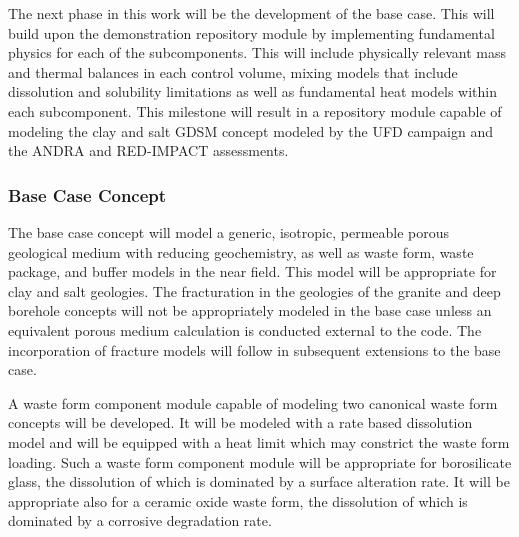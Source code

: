 
The next phase in this work will be the development of the base case. This will 
build upon the demonstration repository module by implementing fundamental 
physics for each of the subcomponents. This will include physically relevant 
mass and thermal balances in each control volume, mixing models that include 
dissolution and solubility limitations as well as fundamental heat  models within 
each subcomponent.  This milestone will result in a repository module capable of
modeling the clay and salt \gls{GDSM} concept modeled by the \gls{UFD} campaign 
and the \gls{ANDRA} and RED-IMPACT  assessments.

\subsubsection{Base Case Concept}




      The base case concept will model a generic, isotropic, permeable porous 
      geological medium with reducing geochemistry, as well as waste form, 
      waste package, and buffer models in the near field. This model will be 
      appropriate for clay and salt geologies. The fracturation in the geologies  
      of the granite and deep borehole concepts will not be appropriately 
      modeled in the base case unless an equivalent porous medium calculation is 
      conducted external to the code. The incorporation of fracture models will 
      follow in subsequent extensions to the base case.

  






      A waste form component module capable of modeling two canonical waste
      form concepts will be developed. It will be modeled with a rate based 
      dissolution model and will be equipped with a heat limit which may 
      constrict the waste form loading. Such a waste form component module will 
      be appropriate for borosilicate glass, the dissolution of which is 
      dominated by a surface alteration rate. It will be appropriate also for a 
      ceramic oxide waste form, the dissolution of which is dominated by a 
      corrosive degradation rate.

